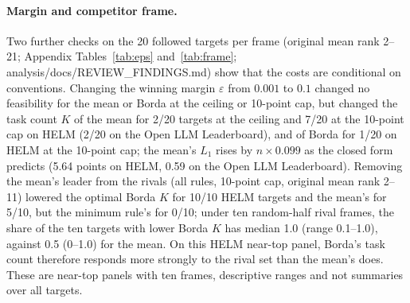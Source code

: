 \paragraph{Margin and competitor frame.} Two further checks on the 20 followed targets per frame (original mean rank 2--21; Appendix Tables~\ref{tab:eps} and~\ref{tab:frame}; analysis/docs/REVIEW\_FINDINGS.md) show that the costs are conditional on conventions. Changing the winning margin $\varepsilon$ from $0.001$ to $0.1$ changed no feasibility for the mean or Borda at the ceiling or 10-point cap, but changed the task count $K$ of the mean for 2/20 targets at the ceiling and 7/20 at the 10-point cap on HELM (2/20 on the Open LLM Leaderboard), and of Borda for 1/20 on HELM at the 10-point cap; the mean's $L_1$ rises by $n\times0.099$ as the closed form predicts (5.64 points on HELM, 0.59 on the Open LLM Leaderboard). Removing the mean's leader from the rivals (all rules, 10-point cap, original mean rank 2--11) lowered the optimal Borda $K$ for 10/10 HELM targets and the mean's for 5/10, but the minimum rule's for 0/10; under ten random-half rival frames, the share of the ten targets with lower Borda $K$ has median 1.0 (range 0.1--1.0), against 0.5 (0--1.0) for the mean. On this HELM near-top panel, Borda's task count therefore responds more strongly to the rival set than the mean's does. These are near-top panels with ten frames, descriptive ranges and not summaries over all targets.

